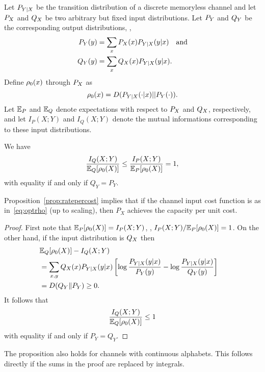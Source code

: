Let $P_{Y|X}$ be the transition distribution of a discrete memoryless channel and
let $P_X$ and $Q_X$ be two arbitrary but fixed input distributions. Let $P_Y$
and $Q_Y$ be the corresponding output distributions, \ie, 
\begin{align*}
  P_Y(y) &= \sum_x P_X(x) P_{Y|X}(y|x) \quad\text{and} \\
  Q_Y(y) &= \sum_x Q_X(x) P_{Y|X}(y|x).
\end{align*}
Define ${\rho_0}(x)$ through $P_X$ as
\begin{equation}
  \label{eq:optrho}
  {\rho_0}(x) = D(P_{Y|X}(\cdot|x)||P_Y(\cdot)).
\end{equation}
Let $\mathbb{E}_P$ and $\mathbb{E}_Q$ denote expectations with respect to $P_X$ and $Q_X$,
respectively, and let $I_P(X;Y)$ and $I_Q(X;Y)$ denote the mutual informations
corresponding to these input distributions. 

\begin{proposition}
  \label{prop:ratepercost}
  We have
  \begin{equation}
    \label{eq:ratepercost}
    \frac{I_Q(X;Y)}{\mathbb{E}_Q[{\rho_0}(X)]} \le \frac{I_P(X;Y)}{\mathbb{E}_P[{\rho_0}(X)]} = 1,
  \end{equation}
  with equality if and only if $Q_Y = P_Y$.
\end{proposition}

Proposition~\ref{prop:ratepercost} implies that if the channel input cost
function is as in~\eqref{eq:optrho} (up to scaling), then $P_X$ achieves the
capacity per unit cost.

\begin{proof}
  First note that $\mathbb{E}_P[{\rho_0}(X)] = I_P(X;Y)$, \ie, $I_P(X;Y) / \mathbb{E}_P[{\rho_0}(X)] = 1$.
  On the other hand, if the input distribution is $Q_X$ then
  \begin{align*}
    \lefteqn{\Expq[\ro(X)] - \Iq(X;Y)} \\
    &= \sum_{x,y} \qx(x) \pyx(y|x) \left[ \log \frac{\pyx(y|x)}{\py(y)} -
    \log \frac{\pyx(y|x)}{\qy(y)} \right] \\
    &= D(\qy \| \py) \ge 0.
  \end{align*}
  It follows that
  \[ \frac{I_Q(X;Y)}{\mathbb{E}_Q [{\rho_0}(X)]} \le 1
  \]
  with equality if and only if $P_Y = Q_Y$.
\end{proof}

\begin{remark}
  \label{rem:continuouscuc}
  The proposition also holds for channels with continuous alphabets. This
  follows directly if the sums in the proof are replaced by integrals.
\end{remark}

